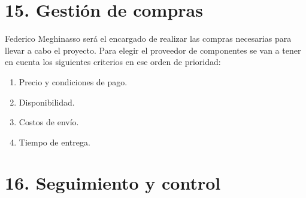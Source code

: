 \documentclass[11pt]{charter}
\begin{document}
\section{15. Gestión de compras}
\label{sec:compras}

Federico Meghinasso será el encargado de realizar las compras necesarias para llevar a cabo el proyecto. Para elegir el proveedor de componentes se van a tener en cuenta los siguientes criterios en ese orden de prioridad:

\begin{enumerate}
    \item Precio y condiciones de pago.
    \item Disponibilidad.
    \item Costos de envío.
    \item Tiempo de entrega.
\end{enumerate}

\pagebreak

\section{16. Seguimiento y control}
\label{sec:seguimiento}
\end{document}

